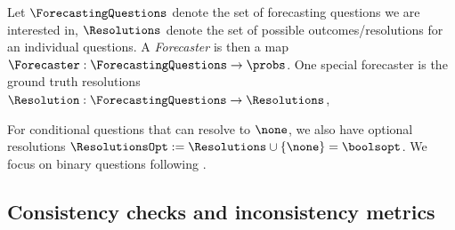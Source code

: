 \begin{notation*}
    Let $\ForecastingQuestions$ denote the set of forecasting questions we are interested in, $\Resolutions$ denote the set of possible outcomes/resolutions for an individual questions.
    A \emph{Forecaster} is then a map $\Forecaster:\ForecastingQuestions\to\probs$.
    One special forecaster is the ground truth resolutions $\Resolution:\ForecastingQuestions\to\Resolutions$, 

    For conditional questions that can resolve to $\none$, we also have optional resolutions $\ResolutionsOpt:=\Resolutions\cup\{\none\}=\boolsopt$.
    We focus on binary questions following \cite{halawiApproachingHumanLevelForecasting2024}.
\end{notation*}

\subsection{Consistency checks and inconsistency metrics}
\label{cfc/sec:consistency-checks-intro}


